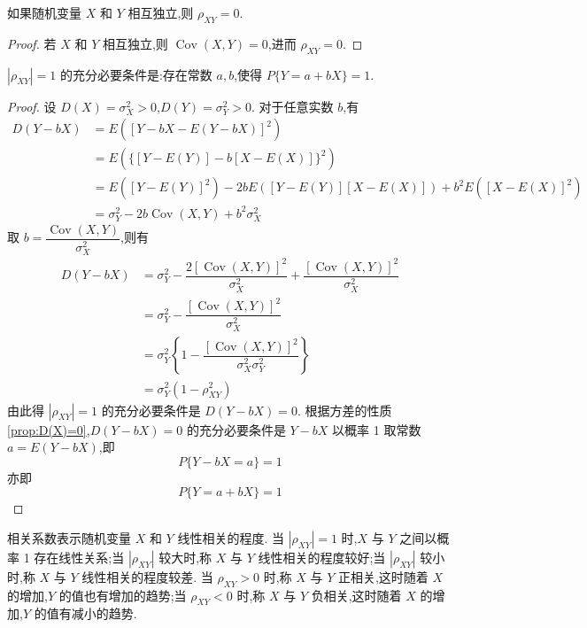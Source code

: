 \begin{property}
    如果随机变量 $X$ 和 $Y$ 相互独立,则 $\rho_{XY} = 0$.
\end{property}

\vspace{-1em}

\begin{proof}
    若 $X$ 和 $Y$ 相互独立,则 $\operatorname{Cov}(X,Y) = 0$,进而 $\rho_{XY} = 0$.
\end{proof}

\begin{property}
    $|\rho_{XY}|=1$ 的充分必要条件是:存在常数 $a,b$,使得 $P\{Y=a+bX\}=1$.
\end{property}

\begin{proof}
    设 $D(X) = \sigma_X^2 > 0$,$D(Y) = \sigma_Y^2 > 0$. 对于任意实数 $b$,有
    $$
    \begin{aligned}
        D(Y-bX) &= E([Y-bX - E(Y-bX)]^2) \\
        &= E( \{[Y-E(Y)] - b[X-E(X)]\}^2 ) \\
        &= E([Y-E(Y)]^2) - 2bE([Y-E(Y)][X-E(X)]) + b^2 E([X-E(X)]^2) \\
        &= \sigma_Y^2 - 2b \operatorname{Cov}(X,Y) + b^2 \sigma_X^2
    \end{aligned}
    $$
    取 $b = \dfrac{\operatorname{Cov}(X,Y)}{\sigma_X^2}$,则有
    $$
    \begin{aligned}
        D(Y-bX) &= \sigma_Y^2 - \dfrac{2 [\operatorname{Cov}(X,Y)]^2}{\sigma_X^2} + \dfrac{[\operatorname{Cov}(X,Y)]^2}{\sigma_X^2} \\
        &= \sigma_Y^2 - \dfrac{[\operatorname{Cov}(X,Y)]^2}{\sigma_X^2} \\
        &= \sigma_Y^2 \left\{ 1 - \dfrac{[\operatorname{Cov}(X,Y)]^2}{\sigma_X^2 \sigma_Y^2} \right\} \\
        &= \sigma_Y^2 (1 - \rho_{XY}^2)
    \end{aligned}
    $$
    由此得 $|\rho_{XY}|=1$ 的充分必要条件是 $D(Y-bX)=0$. 根据方差的性质\ref*{prop:D(X)=0},$D(Y-bX)=0$ 的充分必要条件是 $Y-bX$ 以概率 1 取常数 $a=E(Y-bX)$,即
    $$
    P \{ Y-bX=a \} = 1
    $$
    亦即
    $$
    P\{Y=a+bX\}=1
    $$
\end{proof}

相关系数表示随机变量 $X$ 和 $Y$ 线性相关的程度. 当 $|\rho_{XY}|=1$ 时,$X$ 与 $Y$ 之间以概率 1 存在线性关系;当 $|\rho_{XY}|$ 较大时,称 $X$ 与 $Y$ 线性相关的程度较好;当 $|\rho_{XY}|$ 较小时,称 $X$ 与 $Y$ 线性相关的程度较差. 当 $\rho_{XY} > 0$ 时,称 $X$ 与 $Y$ 正相关,这时随着 $X$ 的增加,$Y$ 的值也有增加的趋势;当 $\rho_{XY} < 0$ 时,称 $X$ 与 $Y$ 负相关,这时随着 $X$ 的增加,$Y$ 的值有减小的趋势.

